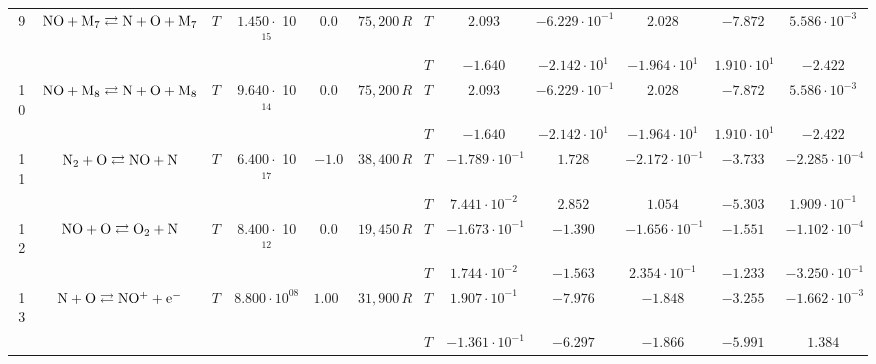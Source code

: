 \documentclass{warpdoc}
\begin{document}
\begin{table}[!ht]
\begin{center}
\begin{threeparttable}
\begin{tabular}{cccccccccccc}
                                                                                   
9 & $\rm NO + M_7 \rightleftarrows N+O+M_7$ &$T$ & $1.450 \cdot$ 10$^{15}$ & $0.0$ & $75,200\, R$ 
                                          &$T$  & $2.093$  & $-6.229 \cdot 10^{-1}$  & $2.028$ & $-7.872$ & $5.586 \cdot 10^{-3}$\\
 & & & & &                                &$T$  & $-1.640$  & $-2.142 \cdot 10^{1}$  & $-1.964 \cdot 10^{1}$ & $1.910 \cdot 10^{1}$ & $-2.422$\\                                          
                                                                                    
10 & $\rm NO + M_8 \rightleftarrows N+O+M_8$ &$T$ & $9.640 \cdot$ 10$^{14}$ & $0.0$ & $75,200\, R$ 
                                          &$T$  & $2.093$  & $-6.229 \cdot 10^{-1}$  & $2.028$ & $-7.872$ & $5.586 \cdot 10^{-3}$\\
 & & & & &                                &$T$  & $-1.640$  & $-2.142 \cdot 10^{1}$  & $-1.964 \cdot 10^{1}$ & $1.910 \cdot 10^{1}$ & $-2.422$\\
 
                                                                                                           
11 & $\rm N_2 + O \rightleftarrows NO+N$ &$T$ & $6.400\cdot$ 10$^{17}$ & $-1.0$ & $38,400\, R$ 
                                          &$T$  & $-1.789 \cdot 10^{-1}$  & $1.728$  & $-2.172 \cdot 10^{-1}$ & $-3.733$ & $-2.285 \cdot 10^{-4}$\\
 & & & & &                                &$T$  & $7.441 \cdot 10^{-2}$  & $2.852$  & $1.054$ & $-5.303$ & $1.909 \cdot 10^{-1}$\\
 
                                          
12 & $\rm NO + O \rightleftarrows O_2+N$ &$T$ &  $8.400\cdot$ 10$^{12}$ & $0.0$ & $19,450\, R$ 
                                          &$T$  & $-1.673 \cdot 10^{-1}$  & $-1.390$  & $-1.656 \cdot 10^{-1}$ & $-1.551$ & $-1.102 \cdot 10^{-4}$\\
 & & & & &                                &$T$  & $1.744 \cdot 10^{-2}$  & $-1.563$  & $2.354 \cdot 10^{-1}$ & $-1.233$ & $-3.250 \cdot 10^{-1}$\\
 
                                          
13 & $\rm N + O \rightleftarrows NO^{+}+e^-$ &$T$ & $8.800 \cdot 10^{08}$ & $1.000$ & $31,900 \, R$ 
                                          &$T$  & $1.907 \cdot 10^{-1}$  & $-7.976$  & $-1.848$ & $-3.255$ & $-1.662 \cdot 10^{-3}$\\
 & & & & &                                &$T$  & $-1.361 \cdot 10^{-1}$  & $-6.297$  & $-1.866$ & $-5.991$ & $1.384$\\
 

\end{tabular}
\end{threeparttable}
\end{center}
\end{table}
\end{document}
